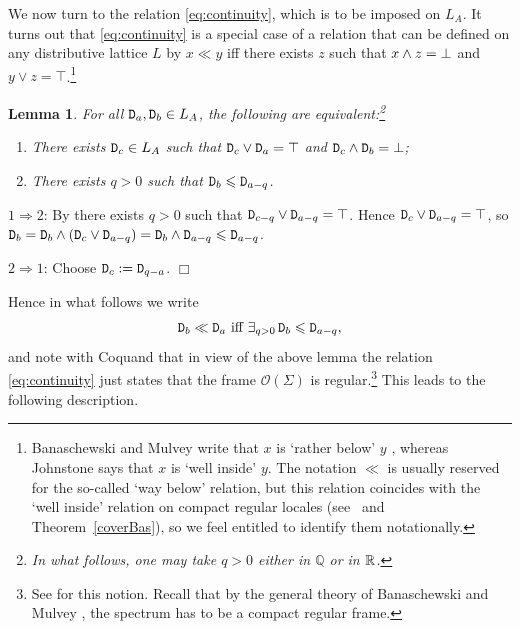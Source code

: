 \documentclass[12pt]{article}
\newcommand{\beq}{\begin{equation}}
\newcommand{\eeq}{\end{equation}}
\newcommand{\er}{\eqref}
\newcommand{\Sg}{\Sigma} \newcommand{\ta}{\tau} \newcommand{\ph}{\phi}
\newcommand{\CO}{{\mathcal O}} \newcommand{\CP}{{\mathcal P}}
\newcommand{\prop}[1]{\ensuremath{\mbox{\texttt{#1}}}}
\newtheorem{lemma}[theorem]{Lemma}
\newenvironment{proof}[1][Proof]%
{ \begin{trivlist}%
  \item[\hskip \labelsep {\bfseries #1}]%
}%
{ \end{trivlist}%
}
\newcommand{\qed}{\nobreak\hfill$\Box$}
\begin{document}
We now turn to the relation \er{eq:continuity}, which is to be imposed on $L_A$. 
It turns out that \er{eq:continuity}
 is a special case of a relation that can be defined on any distributive lattice $L$ by $x\ll y$ iff there exists $z$ such that $x\wedge z=\bot$ and $y\vee z=\top$.\footnote{Banaschewski and Mulvey write that $x$ is `rather below' $y$ \cite{banaschewskimulvey06}, whereas Johnstone \cite{johnstone82} says that  $x$ is `well inside' $y$. The notation $\ll$ is usually reserved for the so-called `way below' relation, but this relation coincides with the `well inside' relation on compact regular locales (see~\cite[p.303]{johnstone82} and Theorem~\ref{coverBas}), so we feel entitled to identify them notationally.}  
\begin{lemma}\label{l23}
For all $\prop{D}_a,\prop{D}_b\in L_A$, the following are equivalent:\footnote{In what follows, one may take $q>0$ either in $\mathbb{Q}$ or in ${\mathbb R}$.}
\begin{enumerate}
\item There exists  $\prop{D}_c\in L_A$ such that $\prop{D}_{c}\vee\prop{D}_{a}=\top$ and
$\prop{D}_{c}\wedge \prop{D}_{b}=\bot$;
\item There exists  $q>0$ such that $\prop{D}_{b}\leqslant \prop{D}_{a-q}$.
\end{enumerate}
\end{lemma}
\begin{proof}
$1\Rightarrow 2$: By \cite[Cor 1.7]{coquand05} there exists $q>0$ such
that $\prop{D}_{c-q}\vee \prop{D}_{a-q}=\top$. Hence $\prop{D}_{c}\vee \prop{D}_{a-q}=\top$, so
$\prop{D}_{b}=\prop{D}_{b}\wedge (\prop{D}_{c}\vee \prop{D}_{a-q}) = \prop{D}_{b}\wedge \prop{D}_{a-q}\leqslant \prop{D}_{a-q}$.

$2\Rightarrow 1$: Choose $\prop{D}_c:=\prop{D}_{q-a}$.
\qed\end{proof}

Hence in what follows we write
 \beq 
 \prop{D}_b\ll
\prop{D}_a \mbox{ iff } \exists_{q >0}\,  \prop{D}_b\leqslant \prop{D}_{a-q}, \label{ssnot}\eeq
and note with Coquand \cite{coquand05} that in view of the above lemma the relation  \er{eq:continuity}
 just states that the frame $\CO(\Sg)$ is regular.\footnote{See \cite[III.1.1]{johnstone82} for this notion. Recall that by the general theory of Banaschewski and Mulvey \cite{banaschewskimulvey06}, the spectrum has to be a compact regular frame.} This leads to the following description. 
  
\end{document}
